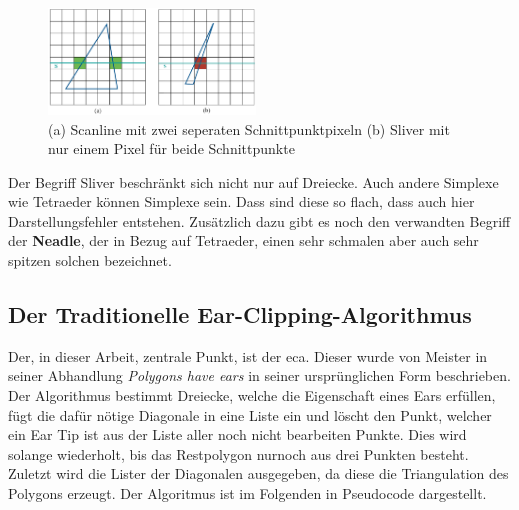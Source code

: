 \begin{figure}
  \centering
  \includegraphics[width=0.49\textwidth]{bilder/sliverScanline.png}
  \caption[Unterschied Sliver und normales Dreieck]{\centering (a) Scanline mit zwei seperaten Schnittpunktpixeln (b) Sliver mit nur einem Pixel für beide Schnittpunkte}
  \label{fig:sliver}
\end{figure}

Der Begriff Sliver beschränkt sich nicht nur auf Dreiecke. Auch andere Simplexe wie Tetraeder können Simplexe sein. Dass sind diese so flach, dass auch hier Darstellungsfehler entstehen.
Zusätzlich dazu gibt es noch den verwandten Begriff der \textbf{Neadle}, der in Bezug auf Tetraeder, einen sehr schmalen aber auch sehr spitzen solchen bezeichnet.\cite{sliver} \linebreak

\subsection{Der Traditionelle Ear-Clipping-Algorithmus}

Der, in dieser Arbeit, zentrale Punkt, ist der \ac{eca}. Dieser wurde von Meister in seiner Abhandlung \emph{Polygons have ears} \cite{meister} in seiner ursprünglichen Form beschrieben.
Der Algorithmus bestimmt Dreiecke, welche die Eigenschaft eines Ears erfüllen, fügt die dafür nötige Diagonale in eine Liste ein und löscht den Punkt, welcher ein Ear Tip ist aus der Liste aller noch nicht 
bearbeiten Punkte. Dies wird solange wiederholt, bis das Restpolygon nurnoch aus drei Punkten besteht. Zuletzt wird die Lister der Diagonalen ausgegeben, da diese die Triangulation des Polygons erzeugt.
Der Algoritmus ist im Folgenden in Pseudocode dargestellt.


